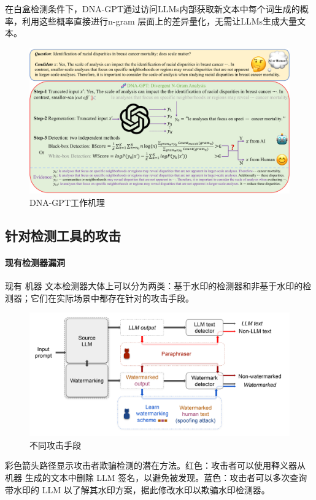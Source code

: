 \documentclass[a4paper]{report}
\begin{document}
在白盒检测条件下，DNA-GPT通过访问LLMs内部获取新文本中每个词生成的概率，利用这些概率直接进行n-gram 层面上的差异量化，无需让LLMs生成大量文本\cite{yang2023dna}。
\begin{figure}[H]
	\centering
	\includegraphics[width=\textwidth]{figures/DNA_GPT.pdf}
	\caption{DNA-GPT工作机理}
	\label{DNA-DetectGPT}
\end{figure}


\subsection{针对检测工具的攻击}
\paragraph{现有检测器漏洞}
现有 机器 文本检测器大体上可以分为两类：基于水印的检测器和非基于水印的检测器；它们在实际场景中都存在针对的攻击手段。
\begin{figure}[H]
	\centering
	\includegraphics[width=1\textwidth]{攻击分类.png}
	\caption{不同攻击手段}
	\label{不同攻击手段}
\end{figure}
彩色箭头路径显示攻击者欺骗检测的潜在方法。红色：攻击者可以使用释义器从 机器 生成的文本中删除 LLM 签名，以避免被发现。蓝色：攻击者可以多次查询带水印的 LLM 以了解其水印方案，据此修改水印以欺骗水印检测器\cite{sadasivan2023can}。
\end{document}
